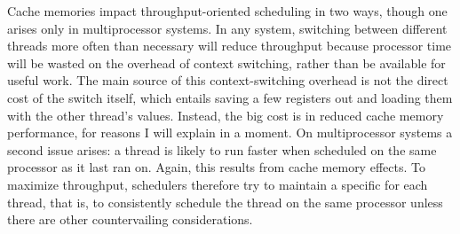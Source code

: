 Cache memories impact throughput-oriented scheduling in two ways,
though one arises only in multiprocessor systems.  In any system,
switching between different threads more often than necessary will
reduce throughput because processor time will be wasted on the
overhead of context switching, rather than be available for useful
work.  The main source of this context-switching overhead is not the
direct cost of the switch itself, which entails saving a few registers out and
loading them with the other thread's values.  Instead, the big cost is
in reduced cache memory performance, for reasons I will explain in a
moment.  On multiprocessor systems a second issue arises:
a thread is likely to run faster when scheduled on the same
processor as it last ran on.  Again, this results from cache memory effects.  To
maximize throughput, schedulers therefore try to maintain
a specific  for each thread,
that is, to consistently schedule the thread on the same processor
unless there are
other countervailing considerations.

